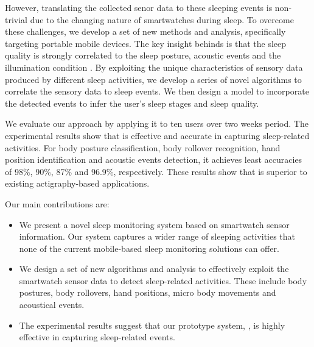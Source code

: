 However, translating the collected senor data to these sleeping events is non-trivial due to the changing nature of smartwatches during
sleep. To overcome these challenges, we develop a set of new methods and analysis, specifically targeting portable mobile devices.  The key
insight behinds {\systemname} is that the sleep quality is strongly correlated to the sleep posture, acoustic events and the illumination
condition \cite{shelgikar2016sleep}. By exploiting the unique characteristics of sensory data produced by different sleep activities, we
develop a series of novel algorithms to correlate the sensory data to sleep events. We then design a model to incorporate the detected
events to
infer the user's sleep stages and sleep quality.

We evaluate our approach by applying it to ten users over two weeks period. The experimental results show that {\systemname} is  effective
and accurate in capturing sleep-related activities. For body posture classification, body rollover recognition, hand position
identification and  acoustic events detection,  it achieves least accuracies of 98\%,  90\%,  87\% and  96.9\%, respectively. These results
show that {\systemname}  is superior to existing actigraphy-based applications.

Our main contributions are:

\begin{itemize}[itemsep=1mm,nolistsep]

\item We present a novel sleep monitoring system based on smartwatch sensor information. Our system captures a wider range of sleeping
    activities that none of the current mobile-based sleep monitoring solutions can offer.

\item We design a set of new algorithms and analysis to effectively exploit the smartwatch sensor data to detect sleep-related
    activities. These include body postures, body rollovers, hand positions, micro body movements and acoustical events.

\item The experimental results suggest that our prototype system, \systemname, is highly effective in capturing sleep-related events.

\end{itemize}
